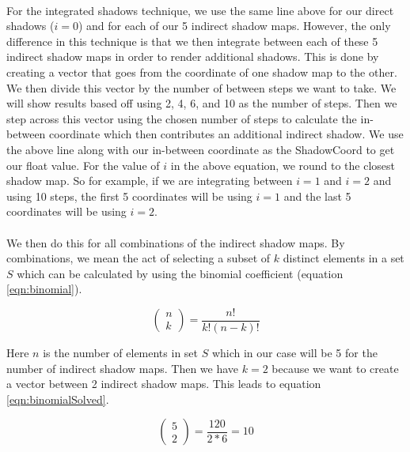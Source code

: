 \paragraph{}
For the integrated shadows technique, we use the same line above for our direct shadows ($i=0$) and for each of our 5 indirect shadow maps.  However, the only difference in this technique is that we then integrate between each of these 5 indirect shadow maps in order to render additional shadows.  This is done by creating a vector that goes from the coordinate of one shadow map to the other.  We then divide this vector by the number of between steps we want to take.  We will show results based off using 2, 4, 6, and 10 as the number of steps. Then we step across this vector using the chosen number of steps to calculate the in-between coordinate which then contributes an additional indirect shadow.  We use the above line along with our in-between coordinate as the ShadowCoord to get our float value.  For the value of $i$ in the above equation, we round to the closest shadow map. So for example, if we are integrating between $i=1$ and $i=2$ and using 10 steps, the first 5 coordinates will be using $i=1$ and the last 5 coordinates will be using $i=2$.

\paragraph{}
We then do this for all combinations of the indirect shadow maps.  By combinations, we mean the act of selecting a subset of $k$ distinct elements in a set $S$ which can be calculated by using the binomial coefficient (equation \ref{eqn:binomial}).

\begin{equation}
\left(
    \begin{array}{c}
      n \\
      k
    \end{array}
  \right) = \frac{n!}{k!(n-k)!} \label{eqn:binomial}
\end{equation}

Here $n$ is the number of elements in set $S$ which in our case will be 5 for the number of indirect shadow maps.  Then we have $k=2$ because we want to create a vector between 2 indirect shadow maps.  This leads to equation \ref{eqn:binomialSolved}.

\begin{equation}
\left(
    \begin{array}{c}
      5 \\
      2
    \end{array}
  \right) = \frac{120}{2*6} = 10\label{eqn:binomialSolved}
\end{equation}

